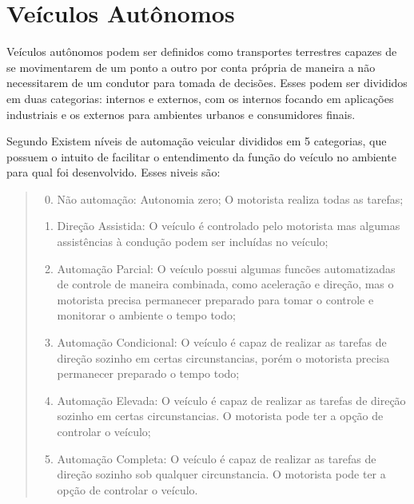 \chapter{Ve{\'i}culos Aut{\^o}nomos}

Veículos autônomos podem ser definidos como transportes terrestres capazes de
se movimentarem de um ponto a outro por conta própria de maneira a não
necessitarem de um condutor para tomada de decisões. Esses podem ser divididos
em duas categorias: internos e externos, com os internos focando em aplicações
industriais e os externos para ambientes urbanos e consumidores finais.

Segundo  Existem níveis de automação veicular divididos em
5 categorias, que possuem o intuito de facilitar o entendimento da função do
veículo no ambiente para qual foi desenvolvido. Esses niveis s{\~a}o:

\begin{quote}
\begin{enumerate}
        \setcounter{enumi}{-1} 
        \item N{\~a}o automa{\c c}{\~a}o: Autonomia zero; O motorista realiza
                todas as tarefas;
        \item Dire{\c c}{\~a}o Assistida: O ve{\'i}culo {\'e} controlado pelo
                motorista mas algumas assist{\^e}ncias {\`a} condu{\c c}{\~a}o
                podem ser inclu{\'i}das no ve{\'i}culo;
        \item Automação Parcial: O veículo possui algumas funcões automatizadas
                de controle de maneira combinada, como aceleração e direção,
                mas o motorista precisa permanecer preparado para tomar o
                controle e monitorar o ambiente o tempo todo;
        \item Automação Condicional: O veículo é capaz de realizar as tarefas
                de direção sozinho em certas circunstancias, porém o motorista
                precisa permanecer preparado o tempo todo;
        \item Automação Elevada: O veículo {\'e} capaz de realizar as tarefas
                de direção sozinho em certas circunstancias. O motorista pode
                ter a opção de controlar o veículo;
        \item Automação Completa: O veículo é capaz de realizar as tarefas de
                direção sozinho sob qualquer circunstancia.  O motorista pode
                ter a opção de controlar o veículo.
\end{enumerate}
\end{quote}

